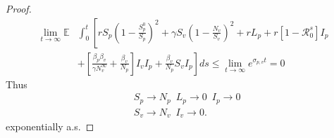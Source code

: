 \begin{proof}
	\begin{align*}
		\lim\limits_{t\rightarrow \infty}\mathbb{E}
			&\int_{0}^{t}
				\left[rS_p\left(1-\frac{S_p^0}{S_p}\right)^2 +\gamma S_v\left(1-\frac{N_v}{S_v}\right)^2+rL_p+r\left[1-\mathcal{R}^s_0\right]I_p \right.\\
			&+
				\left.\left[\frac{\beta_p\beta_v}{\gamma N^\infty_v}+\frac{\beta_v}{N_p}\right]I_vI_p +\frac{\beta_v}{N_p}S_vI_p\right]ds\leq\lim\limits_{t\rightarrow \infty}e^{\sigma_{p,v}t}=0
	\end{align*}
	Thus
		\begin{align*}
			&S_p\rightarrow N_p\,\,\,L_p\rightarrow 0\,\,\, I_p\rightarrow 0\\
			&S_v\rightarrow N_v\,\,\, I_v\rightarrow 0.
		\end{align*}
		exponentially a.s.
\end{proof}
